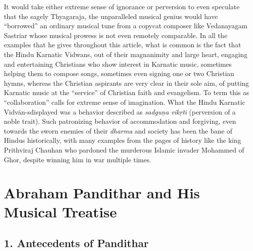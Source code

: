 It would take either extreme sense of ignorance or perversion to even speculate that the sagely Thyagaraja, the unparalleled musical genius would have “borrowed” an ordinary musical tune from a copycat composer like Vedanayagam Sastriar whose musical prowess is not even remotely comparable. In all the examples that he gives throughout this article, what is common is the fact that the Hindu Karnatic Vidwans, out of their magnanimity and large heart, engaging and entertaining Christians who show interest in Karnatic music, sometimes helping them to compose songs, sometimes even signing one or two Christian hymns, whereas the Christian aspirants are very clear in their sole aim, of putting Karnatic music at the “service” of Christian faith and evangelism. To term this as “collaboration” calls for extreme sense of imagination. What the Hindu Karnatic Vidvān-s\break displayed was a behavior described as \textit{sadguṇa vikṛti} (perversion of a noble trait). Such patronizing behavior of accommodation and forgiving, even towards the sworn enemies of their \textit{dharma} and society has been the bane of Hindus historically, with many examples from the pages of history like the king Prithviraj Chauhan who pardoned the murderous Islamic invader Mohammed of Ghor, despite winning him in war multiple times.

\vspace{-.2cm}

\section*{Abraham Pandithar and His Musical Treatise}

\subsection*{1. Antecedents of Pandithar}

